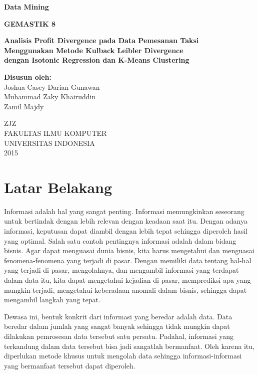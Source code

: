 \documentclass{article}
\begin{document}
\begin{titlepage}

\begin{center}
	
\textbf{Data Mining}

\vspace{0.5cm}
\textbf{GEMASTIK 8}

\vspace{1.5cm}

\textbf{Analisis Profit Divergence pada Data Pemesanan Taksi\\Menggunakan Metode Kulback Leibler Divergence\\dengan Isotonic Regression dan K-Means Clustering}

\vspace{3cm}
\textbf{Disusun oleh:}\\
Joshua Casey Darian Gunawan\\
Muhammad Zaky Khairuddin\\
Zamil Majdy
\vspace{4cm}

ZJZ\\
FAKULTAS ILMU KOMPUTER\\
UNIVERSITAS INDONESIA\\
2015
\end{center}
\end{titlepage}

\tableofcontents
\newpage

\section{Latar Belakang}

Informasi adalah hal yang sangat penting. Informasi memungkinkan seseorang untuk bertindak dengan lebih relevan dengan keadaan saat itu. Dengan adanya informasi, keputusan dapat diambil dengan lebih tepat sehingga diperoleh hasil yang optimal. Salah satu contoh pentingnya informasi adalah dalam bidang bisnis. Agar dapat menguasai dunia bisnis, kita harus mengetahui dan menguasai fenomena-fenomena yang terjadi di pasar. Dengan memiliki data tentang hal-hal yang terjadi di pasar, mengolahnya, dan mengambil informasi yang terdapat dalam data itu, kita dapat mengetahui kejadian di pasar, memprediksi apa yang mungkin terjadi, mengetahui keberadaan anomali dalam bisnis, sehingga dapat mengambil langkah yang tepat.

Dewasa ini, bentuk konkrit dari informasi yang beredar adalah data. Data beredar dalam jumlah yang sangat banyak sehingga tidak mungkin dapat dilakukan pemrosesan data tersebut satu persatu. Padahal, informasi yang terkandung dalam data tersebut bisa jadi sangatlah bermanfaat. Oleh karena itu, diperlukan metode khusus untuk mengolah data sehingga informasi-informasi yang bermanfaat tersebut dapat diperoleh.
\end{document}
